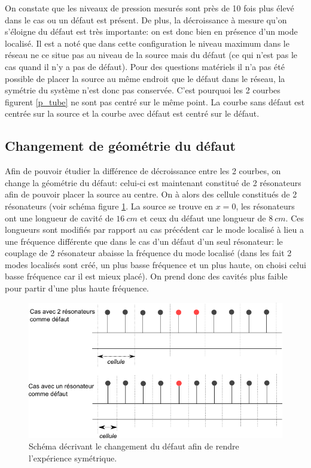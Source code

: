On constate que les niveaux de pression mesurés sont près de 10 fois plus élevé dans le cas ou un défaut est présent. De plus, la décroissance à mesure qu'on s'éloigne du défaut est très importante: on est donc bien en présence d'un mode localisé. Il est a noté que dans cette configuration le niveau maximum dans le réseau ne ce situe pas au niveau de la source mais du défaut (ce qui n'est pas le cas quand il n'y a pas de défaut).
\bigskip
Pour des questions matériels il n'a pas été possible de placer la source au même endroit que le défaut dans le réseau, la symétrie du système n'est donc pas conservée. C'est pourquoi les 2 courbes figurent \ref{p_tube} ne sont pas centré sur le même point. La courbe sans défaut est centrée sur la source et la courbe avec défaut est centré sur le défaut. 

\subsection{Changement de géométrie du défaut}
Afin de pouvoir étudier la différence de décroissance entre les 2 courbes, on change la géométrie du défaut: celui-ci est maintenant constitué de 2 résonateurs afin de pouvoir placer la source au centre. On à alors des cellule constitués de 2 résonateurs (voir schéma figure \ref{fig_exp}. La source se trouve en $x=0$, les résonateurs ont une longueur de cavité de $16~cm$ et ceux du défaut une longueur de $8~cm$. Ces longueurs sont modifiés par rapport au cas précédent car le mode localisé à lieu a une fréquence différente que dans le cas d'un défaut d'un seul résonateur: le couplage de 2 résonateur abaisse la fréquence du mode localisé (dans les fait 2 modes localisés sont créé, un plus basse fréquence et un plus haute, on choisi celui basse fréquence car il est mieux placé). On prend donc des cavités plus faible pour partir d'une plus haute fréquence.

\begin{figure}[!h]
\centering
\includegraphics[scale=0.3]{./images_chp3/chgmt_defaut.png}
\caption{\label{fig_exp} Schéma décrivant le changement du défaut afin de rendre l'expérience symétrique.}
\end{figure}




